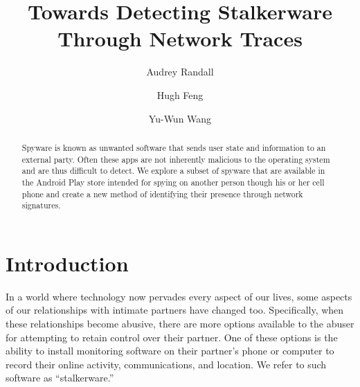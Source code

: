 \documentclass[acmtog]{acmart}
\begin{document}
\title{Towards Detecting Stalkerware Through Network Traces}


\author{Audrey Randall}
\author{Hugh Feng}
\author{Yu-Wun Wang}

\begin{abstract}
Spyware is known as unwanted software that sends user state and information to 
an external party. Often these apps are not inherently malicious to the 
operating system and are thus difficult to detect. We explore a subset of 
spyware that are available in the Android Play store intended for spying on 
another person though his or her cell phone and create a new method of 
identifying their presence through network signatures.  
\end{abstract}

\maketitle

\section{Introduction}
In a world where technology now pervades every aspect of our lives, some 
aspects of our relationships with intimate partners have changed too. 
Specifically, when these relationships become abusive, there are more options 
available to the abuser for attempting to retain control over their partner. 
One of these options is the ability to install monitoring software on their 
partner's phone or computer to record their online activity, communications, 
and location. We refer to such software as ``stalkerware.''  
\end{document}
